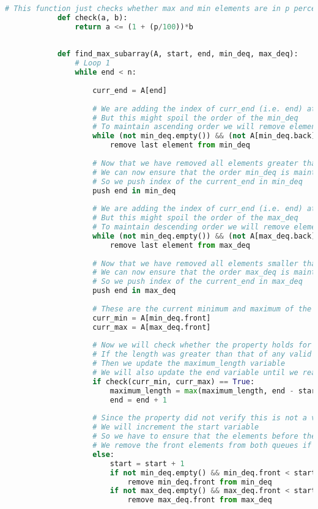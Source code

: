 \documentclass[14pt]{article}
\begin{document}
	    \begin{lstlisting}[language=Python]
	    	# This function just checks whether max and min elements are in p percentage range
	    	def check(a, b):    
	    		return a <= (1 + (p/100))*b
	    	
	    	
	    	def find_max_subarray(A, start, end, min_deq, max_deq):
		    	# Loop 1
		    	while end < n:
			    	
			    	curr_end = A[end]
			    	
			    	# We are adding the index of curr_end (i.e. end) at the back of min_deq 
			    	# But this might spoil the order of the min_deq
			    	# To maintain ascending order we will remove elements greater than curr_end from the back
			    	while (not min_deq.empty()) && (not A[min_deq.back] < curr_end)   
			    		remove last element from min_deq
			    	
			    	# Now that we have removed all elements greater than A[end] from min_deq
			    	# We can now ensure that the order min_deq is maintained
			    	# So we push index of the current_end in min_deq
			    	push end in min_deq
			    	
			    	# We are adding the index of curr_end (i.e. end) at the back of max_deq 
			    	# But this might spoil the order of the max_deq
			    	# To maintain descending order we will remove elements smaller than curr_end from the back
			    	while (not min_deq.empty()) && (not A[max_deq.back] > curr_end)   
			    		remove last element from max_deq
			    	
			    	# Now that we have removed all elements smaller than A[end] from max_deq
			    	# We can now ensure that the order max_deq is maintained
			    	# So we push index of the current_end in max_deq
			    	push end in max_deq
			    	
			    	# These are the current minimum and maximum of the subarray [start....end]
			    	curr_min = A[min_deq.front]
			    	curr_max = A[max_deq.front]
			    	
			    	# Now we will check whether the property holds for our subarray
			    	# If the length was greater than that of any valid subarray we obtained before
			    	# Then we update the maximum_length variable
			    	# We will also update the end variable until we reach the last element of the array
			    	if check(curr_min, curr_max) == True:
			    		maximum_length = max(maximum_length, end - start + 1)
			    		end = end + 1
			    	
			    	# Since the property did not verify this is not a valid subarray
			    	# We will increment the start variable 
			    	# So we have to ensure that the elements before the start index are removed as they are no longer part of subarray
			    	# We remove the front elements from both queues if they are not a part of subarray
			    	else:
				    	start = start + 1
				    	if not min_deq.empty() && min_deq.front < start:
				    		remove min_deq.front from min_deq
				    	if not max_deq.empty() && max_deq.front < start:
				    		remove max_deq.front from max_deq
	    \end{lstlisting}
    
\end{document}
